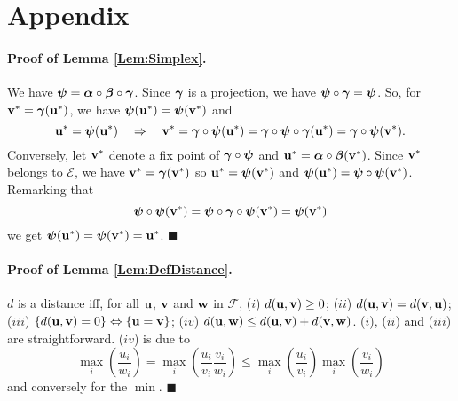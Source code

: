 \documentclass[10pt]{article}
\newcommand{\ubf}{{\bf u}}
\newcommand{\vbf}{{\bf v}}
\newcommand{\wbf}{{\bf w}}
\newcommand{\alphabf}{\mbox{\mathversion{bold}{$\alpha$}}}
\newcommand{\betabf}{\mbox{\mathversion{bold}{$\beta$}}}
\newcommand{\gammabf}{\mbox{\mathversion{bold}{$\gamma$}}}
\newcommand{\psibf}{\mbox{\mathversion{bold}{$\psi$}}}
\newcommand{\Ecal}{{\mathcal E}}
\newcommand{\Fcal}{{\mathcal F}}
\begin{document}
\appendix
\section*{Appendix}

\paragraph{Proof of Lemma {\bf \ref{Lem:Simplex}}.}  We have $\psibf = \alphabf \circ \betabf \circ \gammabf$. Since $\gammabf$
is a projection, we have $\psibf \circ \gammabf = \psibf$. So, for $\vbf^* = \gammabf(\ubf^*)$, we have $\psibf(\ubf^*) = \psibf(\vbf^*)$ and
$$
\ubf^* = \psibf(\ubf^*) \quad \Rightarrow \quad \vbf^* = \gammabf
\circ \psibf(\ubf^*) = \gammabf \circ \psibf \circ \gammabf (\ubf^*) =
\gammabf \circ \psibf(\vbf^*).
$$
Conversely, let $\vbf^*$ denote a fix point of $\gammabf \circ
\psibf$ and $\ubf^* = \alphabf \circ \betabf(\vbf^*)$. Since $\vbf^*$
belongs to $\Ecal$, we have $\vbf^* = \gammabf(\vbf^*)$ so $\ubf^* =
\psibf(\vbf^*)$ and $\psibf(\ubf^*) = \psibf \circ \psibf(\vbf^*)$.
Remarking that
$$
\psibf \circ \psibf(\vbf^*) = \psibf \circ \gammabf \circ
\psibf(\vbf^*) = \psibf(\vbf^*)
$$
we get $\psibf(\ubf^*) = \psibf(\vbf^*) = \ubf^*$.  $\blacksquare$

\paragraph{Proof of Lemma {\bf \ref{Lem:DefDistance}}.} $d$ is a distance
iff, for all $\ubf$, $\vbf$ and $\wbf$ in $\Fcal$, ($i$) $d(\ubf,
\vbf) \geq 0$; ($ii$) $d(\ubf, \vbf) = d(\vbf, \ubf)$; ($iii$)
$\{d(\ubf, \vbf) = 0\} \Leftrightarrow \{\ubf = \vbf\}$; ($iv$)
$d(\ubf, \wbf) \leq d(\ubf, \vbf) + d(\vbf, \wbf)$. ($i$), ($ii$) and
($iii$) are straightforward. ($iv$) is due to
$$
\max_i \left(\frac{u_i}{w_i}\right)
=
\max_i \left(\frac{u_i}{v_i}\frac{v_i}{w_i}\right)
\leq
\max_i \left(\frac{u_i}{v_i}\right) \max_i \left(\frac{v_i}{w_i}\right)
$$
and conversely for the $\min$. $\blacksquare$
\end{document}
